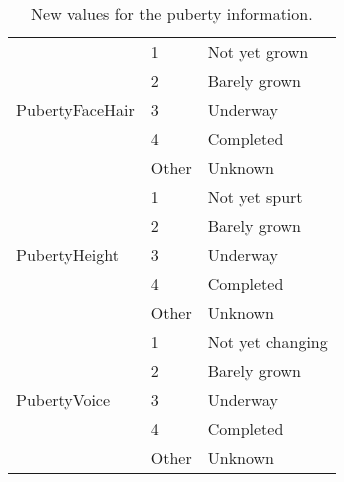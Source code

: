 \begin{table}[H]
\begin{tabular}{l | l | l}
            \multirow{5}{*}{PubertyFaceHair}
				
            	& \multicolumn{1}{l}{1}     & \multicolumn{1}{l}{Not yet grown}    \\\cline{2-3}
                & \multicolumn{1}{l}{2}     & \multicolumn{1}{l}{Barely grown}     \\\cline{2-3}
                & \multicolumn{1}{l}{3}     & \multicolumn{1}{l}{Underway}         \\\cline{2-3}
			& \multicolumn{1}{l}{4}     & \multicolumn{1}{l}{Completed}        \\\cline{2-3}
                & \multicolumn{1}{l}{Other} & \multicolumn{1}{l}{Unknown}          \\\hline
                                    
            \multirow{5}{*}{PubertyHeight}
				
            	& \multicolumn{1}{l}{1}     & \multicolumn{1}{l}{Not yet spurt}    \\\cline{2-3}
                & \multicolumn{1}{l}{2}     & \multicolumn{1}{l}{Barely grown}     \\\cline{2-3}
                & \multicolumn{1}{l}{3}     & \multicolumn{1}{l}{Underway}         \\\cline{2-3}
			& \multicolumn{1}{l}{4}     & \multicolumn{1}{l}{Completed}        \\\cline{2-3}
                & \multicolumn{1}{l}{Other} & \multicolumn{1}{l}{Unknown}          \\\hline
                                    
            \multirow{5}{*}{PubertyVoice}
				
            	& \multicolumn{1}{l}{1}     & \multicolumn{1}{l}{Not yet changing} \\\cline{2-3}
                & \multicolumn{1}{l}{2}     & \multicolumn{1}{l}{Barely grown}     \\\cline{2-3}
                & \multicolumn{1}{l}{3}     & \multicolumn{1}{l}{Underway}         \\\cline{2-3}
			& \multicolumn{1}{l}{4}     & \multicolumn{1}{l}{Completed}        \\\cline{2-3}
                & \multicolumn{1}{l}{Other} & \multicolumn{1}{l}{Unknown}          \\\hline                                   

        \end{tabular}

    \caption{New values for the puberty information.}

\end{table}

